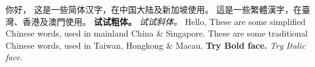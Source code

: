 \documentclass{article}
\begin{document}
	\noindent 你好，\newline
	这是一些简体汉字，在中国大陆及新加坡使用。\newline
	這是一些繁體漢字，在臺灣、香港及澳門使用。\newline
	\textbf{试试粗体。}\newline
	\textit{试试斜体。}\newline
	\newline
	Hello,\newline
	These are some simplified Chinese words, used in mainland China \& Singapore.\newline
	These are some traditional Chinese words, used in Taiwan, Hongkong \& Macau.\newline
	\textbf{Try Bold face.}\newline
	\textit{Try Italic face.}\newline
\end{document}
